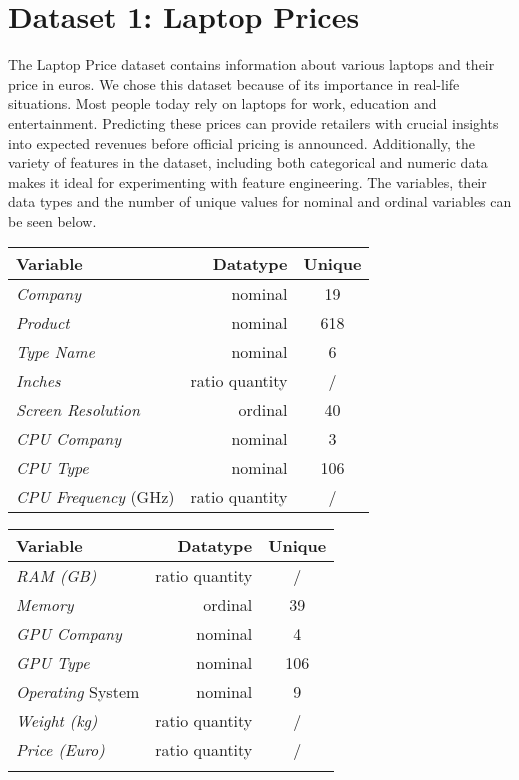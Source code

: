 \documentclass{article}
\begin{document}
\section{Dataset 1: Laptop Prices}
\vspace{-8pt}
The Laptop Price dataset contains information about various laptops and their price in euros. We chose this dataset because of its importance in real-life situations. Most people today rely on laptops for work, education and entertainment. Predicting these prices can provide retailers with crucial insights into expected revenues before official pricing is announced. Additionally, the variety of features in the dataset, including both categorical and numeric data makes it ideal for experimenting with feature engineering. \newline
The variables, their data types and the number of unique values for nominal and ordinal variables can be seen below.
\begin{table}[H]
    \parbox{.45\linewidth}{
        \begin{tabular}{l|r|c}
            \textbf{Variable} & \textbf{Datatype} & \textbf{Unique}\\\hline
            \textit{Company} & nominal & 19 \\
            \textit{Product} & nominal & 618 \\
            \textit{Type Name} & nominal & 6 \\
            \textit{Inches} & ratio quantity & / \\
            \textit{Screen Resolution} & ordinal & 40 \\
            \textit{CPU Company} & nominal & 3 \\
            \textit{CPU Type} & nominal & 106 \\
            \textit{CPU Frequency} (GHz) & ratio quantity & /
        \end{tabular}
}
    \hfill
    \parbox{.45\linewidth}{
        \begin{tabular}{l|r|c}
            \textbf{Variable} & \textbf{Datatype} & \textbf{Unique}\\\hline
            \textit{RAM (GB)} & ratio quantity & / \\
            \textit{Memory} & ordinal & 39 \\
            \textit{GPU Company} & nominal & 4 \\
            \textit{GPU Type} & nominal & 106 \\
            \textit{Operating} System & nominal & 9 \\
            \textit{Weight (kg)} & ratio quantity & / \\
            \textit{Price (Euro)} & ratio quantity & / \\
            & &
        \end{tabular}}      
\end{table}
\end{document}
